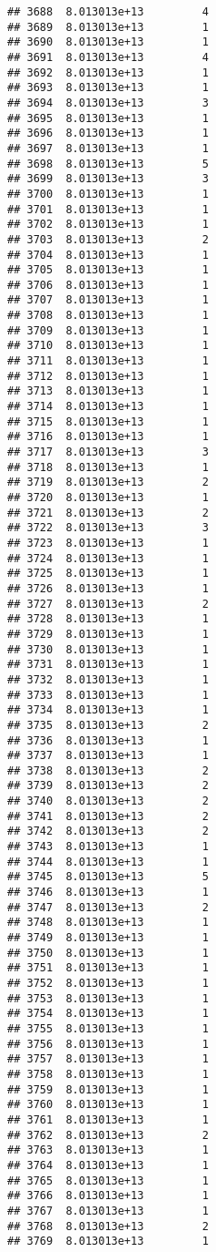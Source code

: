 \documentclass[
]{article}
\begin{document}
\begin{verbatim}
## 3688  8.013013e+13         4
## 3689  8.013013e+13         1
## 3690  8.013013e+13         1
## 3691  8.013013e+13         4
## 3692  8.013013e+13         1
## 3693  8.013013e+13         1
## 3694  8.013013e+13         3
## 3695  8.013013e+13         1
## 3696  8.013013e+13         1
## 3697  8.013013e+13         1
## 3698  8.013013e+13         5
## 3699  8.013013e+13         3
## 3700  8.013013e+13         1
## 3701  8.013013e+13         1
## 3702  8.013013e+13         1
## 3703  8.013013e+13         2
## 3704  8.013013e+13         1
## 3705  8.013013e+13         1
## 3706  8.013013e+13         1
## 3707  8.013013e+13         1
## 3708  8.013013e+13         1
## 3709  8.013013e+13         1
## 3710  8.013013e+13         1
## 3711  8.013013e+13         1
## 3712  8.013013e+13         1
## 3713  8.013013e+13         1
## 3714  8.013013e+13         1
## 3715  8.013013e+13         1
## 3716  8.013013e+13         1
## 3717  8.013013e+13         3
## 3718  8.013013e+13         1
## 3719  8.013013e+13         2
## 3720  8.013013e+13         1
## 3721  8.013013e+13         2
## 3722  8.013013e+13         3
## 3723  8.013013e+13         1
## 3724  8.013013e+13         1
## 3725  8.013013e+13         1
## 3726  8.013013e+13         1
## 3727  8.013013e+13         2
## 3728  8.013013e+13         1
## 3729  8.013013e+13         1
## 3730  8.013013e+13         1
## 3731  8.013013e+13         1
## 3732  8.013013e+13         1
## 3733  8.013013e+13         1
## 3734  8.013013e+13         1
## 3735  8.013013e+13         2
## 3736  8.013013e+13         1
## 3737  8.013013e+13         1
## 3738  8.013013e+13         2
## 3739  8.013013e+13         2
## 3740  8.013013e+13         2
## 3741  8.013013e+13         2
## 3742  8.013013e+13         2
## 3743  8.013013e+13         1
## 3744  8.013013e+13         1
## 3745  8.013013e+13         5
## 3746  8.013013e+13         1
## 3747  8.013013e+13         2
## 3748  8.013013e+13         1
## 3749  8.013013e+13         1
## 3750  8.013013e+13         1
## 3751  8.013013e+13         1
## 3752  8.013013e+13         1
## 3753  8.013013e+13         1
## 3754  8.013013e+13         1
## 3755  8.013013e+13         1
## 3756  8.013013e+13         1
## 3757  8.013013e+13         1
## 3758  8.013013e+13         1
## 3759  8.013013e+13         1
## 3760  8.013013e+13         1
## 3761  8.013013e+13         1
## 3762  8.013013e+13         2
## 3763  8.013013e+13         1
## 3764  8.013013e+13         1
## 3765  8.013013e+13         1
## 3766  8.013013e+13         1
## 3767  8.013013e+13         1
## 3768  8.013013e+13         2
## 3769  8.013013e+13         1

\end{verbatim}
\end{document}

